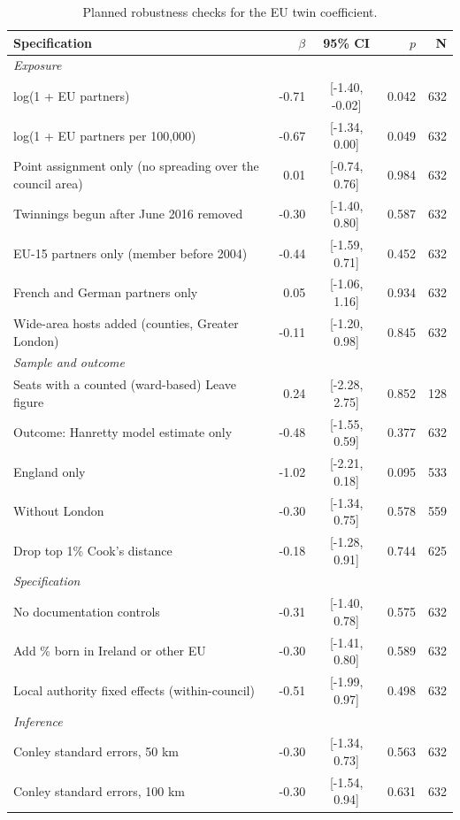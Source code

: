 \documentclass[11pt,a4paper]{article}
\begin{document}
\begin{table}[H]\centering\footnotesize\begin{threeparttable}\caption{Planned robustness checks for the EU twin coefficient.}\label{tab:robust}\begin{tabular}{p{8.2cm}rcrr}\toprule Specification & $\beta$ & 95\% CI & $p$ & N\\\midrule
\multicolumn{5}{l}{\textit{Exposure}}\\
log(1 + EU partners) & -0.71 & [-1.40, -0.02] & 0.042 & 632\\
log(1 + EU partners per 100,000) & -0.67 & [-1.34, 0.00] & 0.049 & 632\\
Point assignment only (no spreading over the council area) & 0.01 & [-0.74, 0.76] & 0.984 & 632\\
Twinnings begun after June 2016 removed & -0.30 & [-1.40, 0.80] & 0.587 & 632\\
EU-15 partners only (member before 2004) & -0.44 & [-1.59, 0.71] & 0.452 & 632\\
French and German partners only & 0.05 & [-1.06, 1.16] & 0.934 & 632\\
Wide-area hosts added (counties, Greater London) & -0.11 & [-1.20, 0.98] & 0.845 & 632\\
\midrule\multicolumn{5}{l}{\textit{Sample and outcome}}\\
Seats with a counted (ward-based) Leave figure & 0.24 & [-2.28, 2.75] & 0.852 & 128\\
Outcome: Hanretty model estimate only & -0.48 & [-1.55, 0.59] & 0.377 & 632\\
England only & -1.02 & [-2.21, 0.18] & 0.095 & 533\\
Without London & -0.30 & [-1.34, 0.75] & 0.578 & 559\\
Drop top 1\% Cook's distance & -0.18 & [-1.28, 0.91] & 0.744 & 625\\
\midrule\multicolumn{5}{l}{\textit{Specification}}\\
No documentation controls & -0.31 & [-1.40, 0.78] & 0.575 & 632\\
Add \% born in Ireland or other EU & -0.30 & [-1.41, 0.80] & 0.589 & 632\\
Local authority fixed effects (within-council) & -0.51 & [-1.99, 0.97] & 0.498 & 632\\
\midrule\multicolumn{5}{l}{\textit{Inference}}\\
Conley standard errors, 50 km & -0.30 & [-1.34, 0.73] & 0.563 & 632\\
Conley standard errors, 100 km & -0.30 & [-1.54, 0.94] & 0.631 & 632\\

\end{tabular}
\end{threeparttable}
\end{table}
\end{document}
